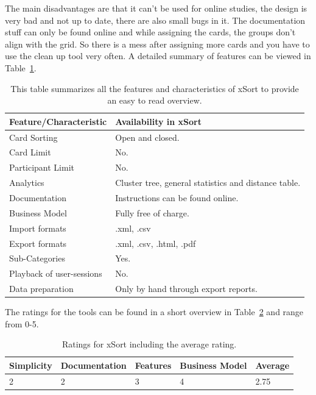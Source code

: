 The main disadvantages are that it can’t be used for online 
studies, the design is very bad and not up to date, there are 
also small bugs in it. The documentation stuff can only be found 
online and while assigning the cards, the groups don’t align 
with the grid. So there is a mess after assigning more cards 
and you have to use the clean up tool very often. A detailed 
summary of features can be viewed in
Table~\ref{tab:features-xSort}. 

\begin{table}[tp]
\centering
\begin{tabularx}
{\linewidth}{|l|X|}
\hline \textbf{Feature/Characteristic} & \textbf{Availability in xSort} \\ 
\hline Card Sorting & Open and closed. \\ 
\hline Card Limit & No. \\
\hline Participant Limit & No. \\
\hline Analytics & Cluster tree, general statistics and distance table. \\ 
\hline Documentation & Instructions can be found online. \\
\hline Business Model & Fully free of charge. \\
\hline Import formats & .xml, .csv \\ 
\hline Export formats & .xml, .csv, .html, .pdf \\ 
\hline Sub-Categories & Yes. \\ 
\hline Playback of user-sessions & No. \\ 
\hline Data preparation & Only by hand through export reports. \\ 
\hline
\end{tabularx} 
\caption[Feature summary of xSort] 
{ 
This table summarizes all the features and characteristics of xSort
to provide an easy to read overview.
}
\label{tab:features-xSort}
\end{table}



The ratings for the tools can be found in a short overview in
Table~\ref{tab:rating-xSort} and range from 0-5.



\begin{table}[tp] 
\centering 
\begin{tabularx}{\linewidth}{|X|X|X|X|X|}
\hline
Simplicity & Documentation & Features & Business Model & Average \\ 
\hline 
2 & 2 & 3 & 4 & 2.75 \\ 
\hline 
\end{tabularx} 
\caption[Ratings for xSort] {
Ratings for xSort including the average rating.
} 
\label{tab:rating-xSort}
\end{table}
